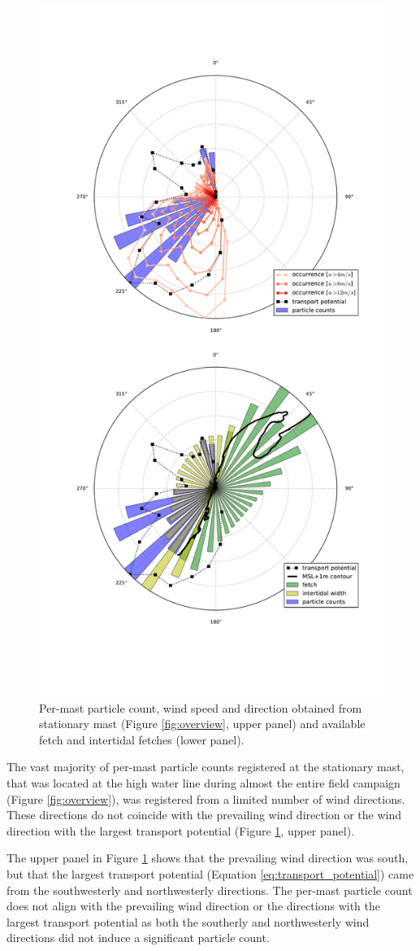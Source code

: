 \begin{figure}
 \centering
  \includegraphics[width=.7\columnwidth]{../Figures/polar_72096_451703}
  \caption{Per-mast particle count, wind speed and direction obtained
    from stationary mast (Figure \ref{fig:overview}, upper panel) and
    available fetch and intertidal fetches (lower panel).}
  \label{fig:pc_direction}
\end{figure}

The vast majority of per-mast particle counts registered at the
stationary mast, that was located at the high water line during almost
the entire field campaign (Figure \ref{fig:overview}), was registered
from a limited number of wind directions. These directions do not
coincide with the prevailing wind direction or the wind direction with
the largest transport potential (Figure \ref{fig:pc_direction}, upper
panel).

The upper panel in Figure \ref{fig:pc_direction} shows that the
prevailing wind direction was south, but that the largest transport
potential (Equation \ref{eq:transport_potential}) came from the
southwesterly and northwesterly directions. The per-mast particle count
does not align with the prevailing wind direction or the directions
with the largest transport potential as both the southerly and
northwesterly wind directions did not induce a significant particle
count.

